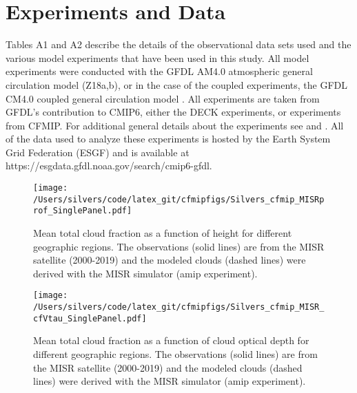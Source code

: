 \documentclass[draft]{agujournal2019}
\begin{document}

\appendix
\section{Experiments and Data}

Tables A1 and A2 describe the details of the observational data sets used and the various model experiments that 
have been used in this study.  All model experiments were conducted with the GFDL AM4.0 atmospheric general 
circulation model (Z18a,b), or in the case of the coupled experiments, the GFDL CM4.0 coupled general circulation 
model \cite{Held_etal_2019}. 
All experiments are taken from GFDL's contribution to CMIP6, either the DECK experiments, or experiments from CFMIP.
For additional general details about the experiments see \cite{Eyring_etal_2016} and \cite{Webb_etal_2017}.  All of the 
data used to analyze these experiments is hosted by the Earth System Grid Federation (ESGF) and is available at 
https://esgdata.gfdl.noaa.gov/search/cmip6-gfdl.

\begin{figure}
  \centering
    \texttt{[image: /Users/silvers/code/latex\_git/cfmipfigs/Silvers\_cfmip\_MISRprof\_SinglePanel.pdf]}
  \caption{Mean total cloud fraction as a function of height for different geographic regions.  The observations (solid lines) are from the MISR satellite (2000-2019) and the modeled clouds (dashed lines) 
  were derived with the MISR simulator (amip experiment).}
  \label{fig:cf_misr_vsHeight}
\end{figure}

\begin{figure}
  \centering
  \texttt{[image: /Users/silvers/code/latex\_git/cfmipfigs/Silvers\_cfmip\_MISR\_cfVtau\_SinglePanel.pdf]}
  \caption{Mean total cloud fraction as a function of cloud optical depth for different geographic regions.  The observations (solid lines) are from the MISR satellite (2000-2019) and the modeled clouds (dashed lines) 
  were derived with the MISR simulator (amip experiment).}
  \label{fig:cf_misr_vsTau}
\end{figure}
\end{document}
